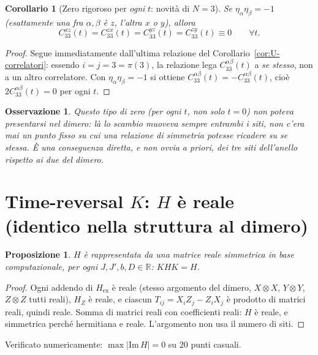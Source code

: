 \documentclass[11pt,a4paper]{article}
\newtheorem{proposizione}{Proposizione}
\newtheorem{corollario}{Corollario}
\newtheorem{osservazione}{Osservazione}
\begin{document}
\begin{corollario}[Zero rigoroso per \emph{ogni} $t$: novità di $N=3$]
\label{cor:zero-sito3}
Se $\eta_\alpha\eta_\beta=-1$ (esattamente una fra $\alpha,\beta$ è $z$, l'altra $x$ o $y$),
allora
$$C_{33}^{xz}(t)=C_{33}^{zx}(t)=C_{33}^{yz}(t)=C_{33}^{zy}(t)\equiv0\qquad\forall t.$$
\end{corollario}
\begin{proof}
Segue immediatamente dall'ultima relazione del Corollario~\ref{cor:U-correlatori}: essendo
$i=j=3=\pi(3)$, la relazione lega $C_{33}^{\alpha\beta}(t)$ a \emph{se stesso}, non a un altro
correlatore. Con $\eta_\alpha\eta_\beta=-1$ si ottiene $C_{33}^{\alpha\beta}(t)=-C_{33}^{\alpha\beta}(t)$,
cioè $2C_{33}^{\alpha\beta}(t)=0$ per ogni $t$.
\end{proof}

\begin{osservazione}
Questo tipo di zero (per ogni $t$, non solo $t=0$) non poteva presentarsi nel dimero: là lo
scambio muoveva sempre \emph{entrambi} i siti, non c'era mai un punto fisso su cui una relazione
di simmetria potesse ricadere su se stessa. È una conseguenza diretta, e non ovvia a priori, dei
tre siti dell'anello rispetto ai due del dimero.
\end{osservazione}

\section{Time-reversal $K$: $H$ è reale (identico nella struttura al dimero)}

\begin{proposizione}
\label{prop:H-reale}
$H$ è rappresentata da una matrice reale simmetrica in base computazionale, per ogni
$J,J',b,D\in\mathbb R$: $KHK=H$.
\end{proposizione}
\begin{proof}
Ogni addendo di $H_{\mathrm{ex}}$ è reale (stesso argomento del dimero, $X\otimes X$,
$Y\otimes Y$, $Z\otimes Z$ tutti reali), $H_Z$ è reale, e ciascun $T_{ij}=X_iZ_j-Z_iX_j$ è
prodotto di matrici reali, quindi reale. Somma di matrici reali con coefficienti reali: $H$ è
reale, e simmetrica perché hermitiana e reale. L'argomento non usa il numero di siti.
\end{proof}
Verificato numericamente: $\max|\mathrm{Im}\,H|=0$ su 20 punti casuali.
\end{document}
